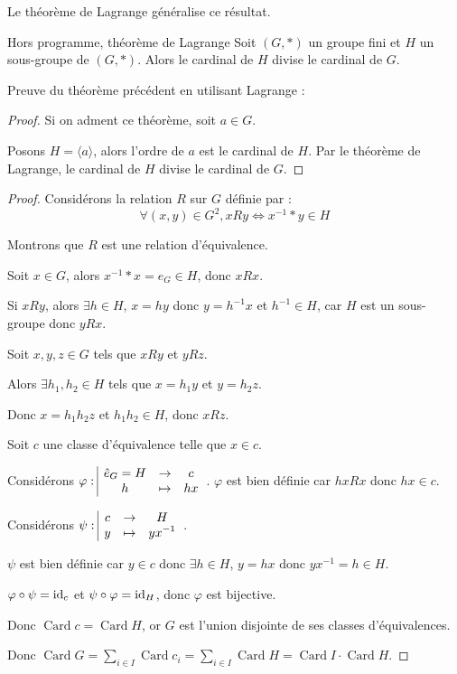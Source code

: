 Le théorème de Lagrange généralise ce résultat.

\begin{theoreme}{Hors programme, théorème de Lagrange}{}
    Soit $(G, \ast)$ un groupe fini et $H$ un sous-groupe de $(G, \ast)$.
    Alors le cardinal de $H$ divise le cardinal de $G$.
    
\end{theoreme}

Preuve du théorème précédent en utilisant Lagrange :
\begin{proof}
    Si on adment ce théorème, soit $a \in G$.

    Posons $H = \langle a \rangle$, alors l'ordre de $a$ est le cardinal de $H$.
    Par le théorème de Lagrange, le cardinal de $H$ divise le cardinal de $G$.
\end{proof}


\avspace {}


\svspace \begin{proof}
    Considérons la relation $R$ sur $G$ définie par :
    $$\forall (x, y) \in G^2, x R y \Leftrightarrow x^{-1} \ast y \in H$$

    Montrons que $R$ est une relation d'équivalence.

    
    \svspace Soit $x \in G$, alors $x^{-1} \ast x = e_G \in H$, donc $x R x$.
    

    \svspace Si $x R y$, alors $\exists h \in H$, $x = hy$ donc $y = h^{-1} x$ 
    et $h^{-1} \in H$, car $H$ est un sous-groupe donc $y R x$.


    \svspace Soit $x, y, z \in G$ tels que $x R y$ et $y R z$.

    Alors $\exists h_1, h_2 \in H$ tels que $x = h_1 y$ et $y = h_2 z$.

    Donc $x = h_1 h_2 z$ et $h_1 h_2 \in H$, donc $x R z$.

    
    \lvspace Soit $c$ une classe d'équivalence telle que $x \in c$. 

    Considérons $\varphi: \space \begin{array}{|ccc} \displaystyle \hat e_G = H & \to & \displaystyle c \\ \displaystyle h & \mapsto & \displaystyle h x \end{array}$. 
    $\varphi$ est bien définie car $hx R x$ donc $hx \in c$. 

    Considérons $\psi: \space \begin{array}{|ccc} \displaystyle c & \to & \displaystyle H \\ \displaystyle y & \mapsto & \displaystyle yx^{-1} \end{array}$.

    $\psi$ est bien définie car $y \in c$ donc $\exists h \in H$, $y = hx$ donc $yx^{-1} = h \in H$.

    $\varphi \circ \psi = \operatorname{id}_c$ et $\psi \circ \varphi = \operatorname{id}_H$, donc $\varphi$ est bijective. 

    Donc $\operatorname{Card} c = \operatorname{Card} H$, or $G$ est l'union disjointe de ses classes d'équivalences.

    Donc $\operatorname{Card} G = \sum_{i \in I} \operatorname{Card} c_i = \sum_{i \in I} \operatorname{Card} H = \operatorname{Card} I \cdot \operatorname{Card} H$.
\end{proof}

